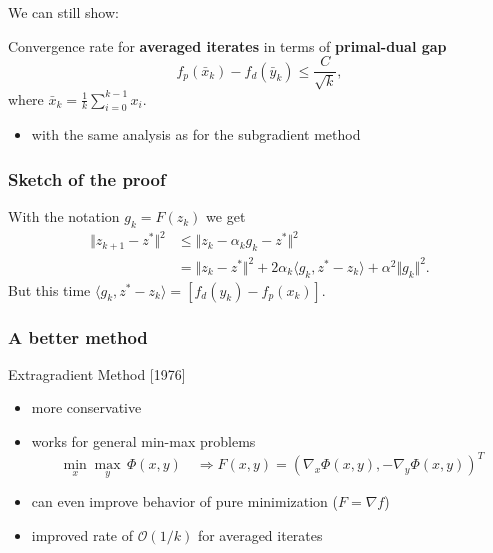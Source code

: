 \documentclass[aspectratio=149]{beamer}
\begin{document}
\begin{frame}
  \frametitle{}

  We can still show:
  \begin{theorem}
    Convergence rate for \textbf{averaged iterates} in terms of \textbf{primal-dual gap}
    \begin{equation}
      f_p(\bar{x}_k) - f_d(\bar{y}_k) \le \frac{C}{ \sqrt{k}},
    \end{equation}
    where $\bar{x}_k = \frac{1}{k} \sum_{i=0}^{k-1} x_i$.
  \end{theorem}

  \begin{itemize}
    \item with the same analysis as for the subgradient method
  \end{itemize}
\end{frame}

\begin{frame}
  \frametitle{Sketch of the proof}
  With the notation $g_k = F(z_k)$ we get
  \begin{equation}
    \begin{aligned}
      \Vert z_{k+1} - z^* \Vert^2 &\le \Vert z_k - \alpha_k g_k - z^* \Vert^2 \\
      &= \Vert z_k-z^* \Vert^2 + 2 \alpha_k \langle g_k, z^*-z_k \rangle + \alpha^2 \Vert g_k \Vert^2.
    \end{aligned}
  \end{equation}
  But this time $\langle g_k, z^* - z_k \rangle = [f_d(y_k) - f_p(x_k)]$.
\end{frame}


\begin{frame}
  \frametitle{A better method}

  \begin{algorithm}[H]
    \caption{Extragradient Method [1976]}
    \begin{algorithmic}[1]
      \EndFor{}
    \end{algorithmic}
  \end{algorithm}

  \begin{itemize}
    \item more conservative
    \item works for general min-max problems
          \begin{equation}
            \min_x \max_y \, \Phi(x,y) \quad \Rightarrow F(x,y) = {(\nabla_x \Phi(x,y), - \nabla_y \Phi(x,y))}^T
          \end{equation}
    \item can even improve behavior of pure minimization ($F = \nabla f$)
    \item improved rate of $\mathcal{O}(1/k)$ for averaged iterates
  \end{itemize}
\end{frame}
\end{document}
